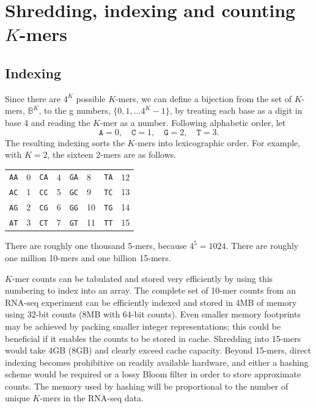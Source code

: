 \documentclass[11pt]{article}
\begin{document}
\section{Shredding, indexing and counting $K$-mers}



\subsection{Indexing}
Since there are $4^K$ possible $K$-mers, we can 
define a bijection from the set of $K$-mers, $\mathbb{B}^K$, to the
g numbers, $\{ 0, 1, \ldots 4^K-1 \}$,
by treating each base as a digit in base 4 and reading the
$K$-mer as a number.  Following alphabetic order, let
\[
  \texttt{A} = 0,
  \quad \texttt{C} = 1,
  \quad \texttt{G} = 2,
  \quad \texttt{T} = 3.
\]
The resulting indexing sorts the $K$-mers into lexicographic order.
For example, with $K = 2$, the sixteen 2-mers are as follows.

\begin{center}
\begin{tabular}{ll|ll|ll|ll}
  \texttt{AA} & 0 & \texttt{CA} & 4 &   \texttt{GA} & 8 & \texttt{TA} & 12
  \\
  \texttt{AC} & 1 & \texttt{CC} & 5 &   \texttt{GC} & 9 & \texttt{TC} & 13
  \\
  \texttt{AG} & 2 & \texttt{CG} & 6 &   \texttt{GG} & 10 & \texttt{TG} & 14
  \\
  \texttt{AT} & 3 & \texttt{CT} & 7 &   \texttt{GT} & 11 & \texttt{TT} & 15
\end{tabular}
\end{center}
There are roughly one thousand 5-mers, because $4^5 = 1024$.  There are
roughly one million 10-mers and one billion 15-mers.

$K$-mer counts can be tabulated and stored very efficiently by using
this numbering to index into an array.  The complete set of 10-mer
counts from an RNA-seq experiment can be efficiently indexed and
stored in 4MB of memory using 32-bit counts (8MB with 64-bit counts).
Even smaller memory footprints may be achieved by packing smaller
integer representations; this could be beneficial if it enables the
counts to be stored in cache.  Shredding into 15-mers would take 4GB
(8GB) and clearly exceed cache capacity.  Beyond 15-mers, direct
indexing becomes prohibitive on readily available hardware, and either
a hashing scheme would be required or a lossy Bloom filter in order to
store approximate counts.  The memory used by hashing will be
proportional to the number of unique $K$-mers in the RNA-seq data.
\end{document}
